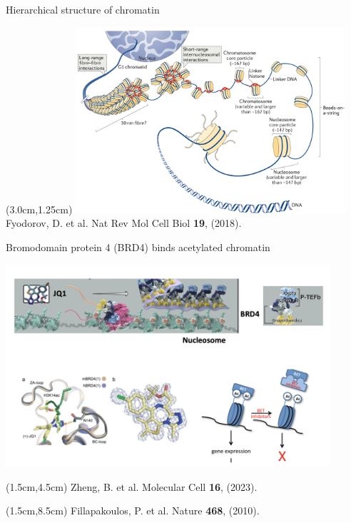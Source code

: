\documentclass{beamer}					%
\begin{document}
\begin{frame}{Hierarchical structure of chromatin}

\begin{textblock*}{10cm}(3.0cm,1.25cm)
\includegraphics[width=10cm]{../../dissertation/dissertation/media/Chromatin}
\\
\vspace{0.4cm}
Fyodorov, D. et al. Nat Rev Mol Cell Biol \textbf{19}, (2018).
\end{textblock*}

\end{frame}

\begin{frame}{Bromodomain protein 4 (BRD4) binds acetylated chromatin}

\includegraphics[width=12cm]{../../dissertation/dissertation/media/Epigenetic}

\begin{textblock*}{10cm}(1.5cm,4.5cm)
Zheng, B. et al. Molecular Cell \textbf{16}, (2023).
\end{textblock*}

\begin{textblock*}{10cm}(1.5cm,8.5cm)
Fillapakoulos, P. et al. Nature \textbf{468}, (2010).
\end{textblock*}

\end{frame}
\end{document}
